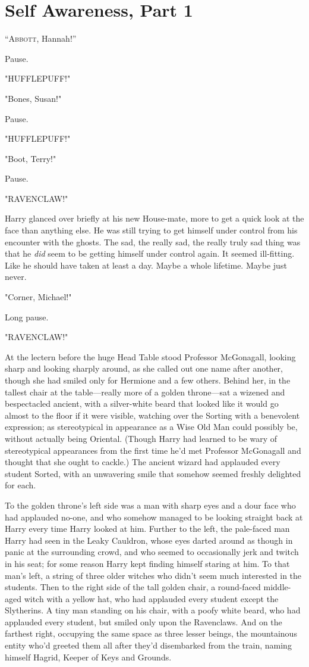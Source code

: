 \chapter{Self Awareness, Part 1}

\lettrine{“A}{bbott}, Hannah!''

Pause.

"HUFFLEPUFF!"

"Bones, Susan!"

Pause.

"HUFFLEPUFF!"

"Boot, Terry!"

Pause.

"RAVENCLAW!"

Harry glanced over briefly at his new House-mate, more to get a quick look at
the face than anything else. He was still trying to get himself under control
from his encounter with the ghosts. The sad, the really sad, the really truly
sad thing was that he \emph{did} seem to be getting himself under control
again. It seemed ill-fitting. Like he should have taken at least a day. Maybe a
whole lifetime. Maybe just never.

"Corner, Michael!"

Long pause.

"RAVENCLAW!"

At the lectern before the huge Head Table stood Professor McGonagall, looking
sharp and looking sharply around, as she called out one name after another,
though she had smiled only for Hermione and a few others. Behind her, in the
tallest chair at the table---really more of a golden throne---sat a wizened and
bespectacled ancient, with a silver-white beard that looked like it would go
almost to the floor if it were visible, watching over the Sorting with a
benevolent expression; as stereotypical in appearance as a Wise Old Man could
possibly be, without actually being Oriental. (Though Harry had learned to be
wary of stereotypical appearances from the first time he'd met Professor
McGonagall and thought that she ought to cackle.) The ancient wizard had
applauded every student Sorted, with an unwavering smile that somehow seemed
freshly delighted for each.

To the golden throne's left side was a man with sharp eyes and a dour face who
had applauded no-one, and who somehow managed to be looking straight back at
Harry every time Harry looked at him. Further to the left, the pale-faced man
Harry had seen in the Leaky Cauldron, whose eyes darted around as though in
panic at the surrounding crowd, and who seemed to occasionally jerk and twitch
in his seat; for some reason Harry kept finding himself staring at him. To that
man's left, a string of three older witches who didn't seem much interested in
the students. Then to the right side of the tall golden chair, a round-faced
middle-aged witch with a yellow hat, who had applauded every student except the
Slytherins. A tiny man standing on his chair, with a poofy white beard, who had
applauded every student, but smiled only upon the Ravenclaws. And on the
farthest right, occupying the same space as three lesser beings, the
mountainous entity who'd greeted them all after they'd disembarked from the
train, naming himself Hagrid, Keeper of Keys and Grounds.

